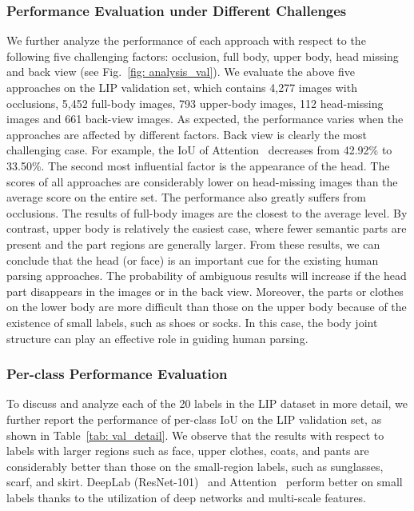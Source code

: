 \documentclass[10pt,journal,compsoc]{IEEEtran}
\begin{document}
\subsubsection{Performance Evaluation under Different Challenges}
We further analyze the performance of each approach with respect to the following five challenging factors: occlusion, full body, upper body, head missing and back view (see Fig.~\ref{fig: analysis_val}). We evaluate the above five approaches on the LIP validation set, which contains 4,277 images with occlusions, 5,452 full-body images, 793 upper-body images, 112 head-missing images and 661 back-view images. As expected, the performance varies when the approaches are affected by different factors. Back view is clearly the most challenging case. For example, the IoU of Attention~\cite{chen2015attention} decreases from 42.92\% to 33.50\%. The second most influential factor is the appearance of the head. The scores of all approaches are considerably lower on head-missing images than the average score on the entire set. The performance also greatly suffers from occlusions. The results of full-body images are the closest to the average level. By contrast, upper body is relatively the easiest case, where fewer semantic parts are present and the part regions are generally larger. From these results, we can conclude that the head (or face) is an important cue for the existing human parsing approaches. The probability of ambiguous results will increase if the head part disappears in the images or in the back view. Moreover, the parts or clothes on the lower body are more difficult than those on the upper body because of the existence of small labels, such as shoes or socks. In this case, the body joint structure can play an effective role in guiding human parsing.
\subsubsection{Per-class Performance Evaluation}
To discuss and analyze each of the 20 labels in the LIP dataset in more detail, we further report the performance of per-class IoU on the LIP validation set, as shown in Table~\ref{tab: val_detail}. We observe that the results with respect to labels with larger regions such as face, upper clothes, coats, and pants are considerably better than those on the small-region labels, such as sunglasses, scarf, and skirt. DeepLab (ResNet-101)~\cite{chen2016deeplab} and Attention~\cite{chen2015attention} perform better on small labels thanks to the utilization of deep networks and multi-scale features.
\end{document}
